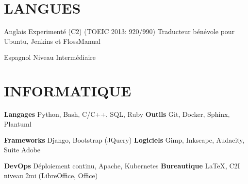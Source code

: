 \documentclass[11pt,a4paper]{moderncv}
\begin{document}


  \section{LANGUES}

  \cvlanguage
    {Anglais}
    {Experimenté (C2) (TOEIC 2013: 920/990)}
    {Traducteur bénévole pour Ubuntu, Jenkins et FlossManual}

  \cvlanguage
    {Espagnol}
    {Niveau Intermédiaire}
    {}{}{}{}

  \section{INFORMATIQUE}

  \cvcomputer
    {\textbf{Langages}}
    {Python, Bash, C/C++, SQL, Ruby}
    {\textbf{Outils}}
    {Git, Docker, Sphinx, Plantuml}

  \cvcomputer
    {\textbf{Frameworks}}
    {Django, Bootstrap (JQuery)}
    {\textbf{Logiciels}}
    {Gimp, Inkscape, Audacity, Suite Adobe}

  \cvcomputer
    {\textbf{DevOps}}
    {Déploiement continu, Apache, Kubernetes}
    {\textbf{Bureautique}}
    {\LaTeX{}, C2I niveau 2mi (LibreOffice, Office)}
\end{document}
